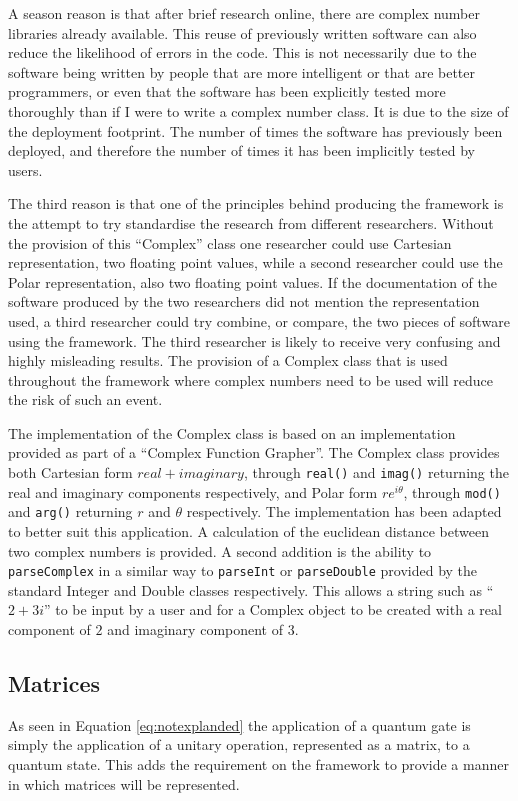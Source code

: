 A season reason is that after brief research online, there are complex number libraries already available.
This reuse of previously written software can also reduce the likelihood of errors in the code.
This is not necessarily due to the software being written by people that are more intelligent or that are better programmers, or even that the software has been explicitly tested more thoroughly than if I were to write a complex number class.
It is due to the size of the deployment footprint.
The number of times the software has previously been deployed, and therefore the number of times it has been implicitly tested by users.

The third reason is that one of the principles behind producing the framework is the attempt to try standardise the research from different researchers.
Without the provision of this ``Complex'' class one researcher could use Cartesian representation, two floating point values, while a second researcher could use the Polar representation, also two floating point values.
If the documentation of the software produced by the two researchers did not mention the representation used, a third researcher could try combine, or compare, the two pieces of software using the framework.
The third researcher is likely to receive very confusing and highly misleading results.
The provision of a Complex class that is used throughout the framework where complex numbers need to be used will reduce the risk of such an event.

The implementation of the Complex class is based on an implementation provided as part of a ``Complex Function Grapher''\cite{compimp}.
The Complex class provides both Cartesian form $real + imaginary$, through \lstinline{real()} and \lstinline{imag()} returning the real and imaginary components respectively, and Polar form $re^{i\theta}$, through \lstinline{mod()} and \lstinline{arg()} returning $r$ and $\theta$ respectively.
The implementation has been adapted to better suit this application.
A calculation of the euclidean distance between two complex numbers is provided.
A second addition is the ability to \lstinline{parseComplex} in a similar way to \lstinline{parseInt} or \lstinline{parseDouble} provided by the standard Integer and Double classes respectively.
This allows a string such as ``$2+3i$'' to be input by a user and for a Complex object to be created with a real component of $2$ and imaginary component of $3$.

\subsection{Matrices}
As seen in Equation \ref{eq:notexplanded} the application of a quantum gate is simply the application of a unitary operation, represented as a matrix, to a quantum state.
This adds the requirement on the framework to provide a manner in which matrices will be represented.

